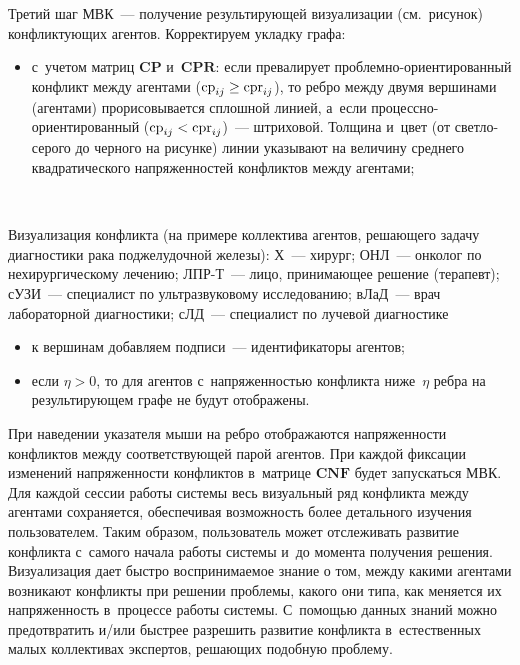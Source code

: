 \begin{multicols}{2}
   Третий шаг МВК~--- получение результирующей визуализации (см.\ 
рисунок) конфликтующих агентов. Корректируем укладку графа:
   \begin{itemize}
\item с~учетом матриц $\mathbf{CP}$ и~$\mathbf{CPR}$: если превалирует  
проб\-лем\-но-ори\-ен\-ти\-ро\-ван\-ный конфликт между агентами 
($\mathrm{cp}_{ij}\hm\geq \mathrm{cpr}_{ij}$), то ребро между двумя вершинами (агентами) 
прорисовывается сплошной линией, а~если  
про\-цес\-сно-ори\-ен\-ти\-ро\-ван\-ный ($\mathrm{cp}_{ij}\hm< \mathrm{cpr}_{ij}$)~--- штриховой. 
Толщина и~цвет (от светло-серого до черного на рисунке) линии указывают на величину 
среднего квадратического напряженностей конфликтов между агентами;
\end{itemize}

{ \begin{center}  %
 \vspace*{3pt}
    \mbox{%
    \epsfxsize=78.651mm 
 }

\end{center}

\noindent
{\small
Визуализация конфликта (на примере коллектива агентов, решающего задачу диагностики 
рака поджелудочной железы): Х~--- хирург; 
ОНЛ~--- онколог по нехирургическому лечению; 
ЛПР-Т~--- лицо, принимающее решение (терапевт); 
сУЗИ~--- специалист по ультразвуковому исследованию; 
вЛаД~--- врач лабораторной диагностики; 
сЛД~--- специалист по лучевой диагностике
}}


\begin{itemize}
\item к вершинам добавляем подписи~--- идентификаторы агентов;\\[-14pt]
\item если $\eta>0$, то для агентов с~напряженностью конфликта 
ниже~$\eta$ ребра на результирующем графе не будут отображены.\\[-14pt]
\end{itemize}

  При наведении указателя мыши на ребро отоб\-ра\-жа\-ют\-ся напряженности 
конфликтов между соответствующей парой агентов. При каждой фиксации 
изменений напряженности конфликтов в~мат\-ри\-це $\mathbf{CNF}$ будет 
запускаться МВК. Для каждой сессии работы системы весь визуальный ряд 
конфликта между агентами сохраняется, обеспечивая возможность более 
детального изучения пользователем. Таким образом, пользователь может 
отслеживать развитие конфликта с~самого начала работы системы и~до 
момента получения решения. Визуализация дает быстро воспринимаемое 
знание о том, между какими агентами возникают конфликты при решении 
проблемы, какого они типа, как меняется их напряженность в~процессе 
работы системы.  
С~по\-мощью данных знаний можно предотвратить и/или быстрее разрешить 
развитие конфликта в~естественных малых коллективах экспертов, решающих 
подобную проблему.


\end{multicols}
